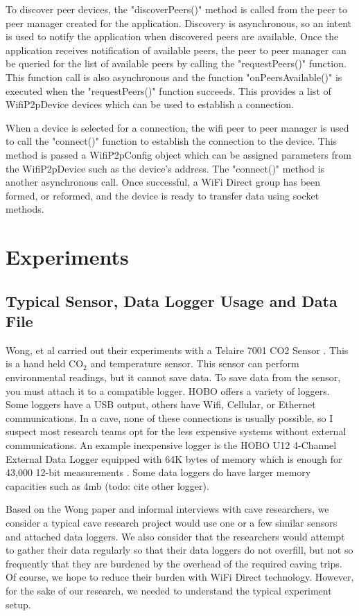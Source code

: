 \documentclass[10pt,twocolumn]{article}
\begin{document}
To discover peer devices, the "discoverPeers()" method is called from the peer to peer manager created for the application.
Discovery is asynchronous, so an intent is used to notify the application when discovered peers are available.
Once the application receives notification of available peers, the peer to peer manager can be queried for the list of available peers by calling the "requestPeers()" function. 
This function call is also asynchronous and the function "onPeersAvailable()" is executed when the "requestPeers()" function succeeds. 
This provides a list of WifiP2pDevice devices which can be used to establish a connection. \cite{androidp2p}

When a device is selected for a connection, the wifi peer to peer manager is used to call the "connect()" function to establish the connection to the device. 
This method is passed a WifiP2pConfig object which can be assigned parameters from the WifiP2pDevice such as the device's address.
The "connect()" method is another asynchronous call. 
Once successful, a WiFi Direct group has been formed, or reformed, and the device is ready to transfer data using socket methods.

\section{Experiments}

\subsection{Typical Sensor, Data Logger Usage and Data File}
\label{sec:TypicalUsage}
Wong, et al carried out their experiments with a Telaire 7001 CO2 Sensor \cite{telaire} \cite{wong2010}. 
This is a hand held CO$_2$ and temperature sensor.
This sensor can perform environmental readings, but it cannot save data.
To save data from the sensor, you must attach it to a compatible logger.
HOBO offers a variety of loggers.
Some loggers have a USB output, others have Wifi, Cellular, or Ethernet communications.
In a cave, none of these connections is usually possible, so I suspect most research teams opt for the less expensive systems without external communications.
An example inexpensive logger is the HOBO U12 4-Channel External Data Logger equipped with 64K bytes of memory which is enough for 43,000 12-bit measurements \cite{logger}. 
Some data loggers do have larger memory capacities such as 4mb (todo: cite other logger).

Based on the Wong paper and informal interviews with cave researchers, we consider a typical cave research project would use one or a few similar sensors and attached data loggers.
We also consider that the researchers would attempt to gather their data regularly so that their data loggers do not overfill, but not so frequently that they are burdened by the overhead of the required caving trips.
Of course, we hope to reduce their burden with WiFi Direct technology.
However, for the sake of our research, we needed to understand the typical experiment setup.
\end{document}
